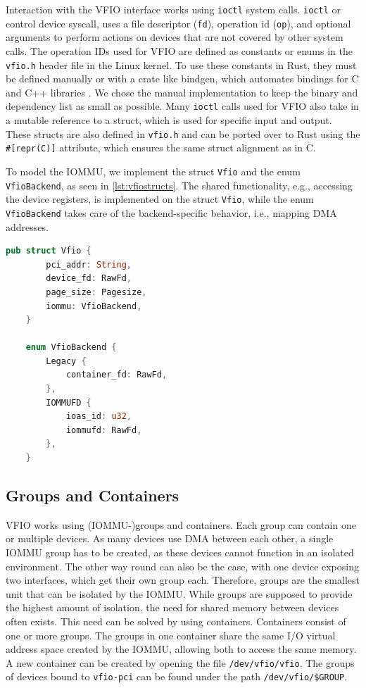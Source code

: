 Interaction with the VFIO interface works using \texttt{ioctl} system calls.
\texttt{ioctl} or control device syscall, uses a file descriptor (\texttt{fd}), operation id (\texttt{op}), and optional arguments to perform actions on devices that are not covered by other system calls.
The operation IDs used for VFIO are defined as constants or enums in the \texttt{vfio.h} header file in the Linux kernel. To use these constants in Rust, they must be defined manually or with a crate like bindgen, which automates bindings for C and C++ libraries \cite{cratebindgen}. We chose the manual implementation to keep the binary and dependency list as small as possible.
Many \texttt{ioctl} calls used for VFIO also take in a mutable reference to a struct, which is used for specific input and output. These structs are also defined in \texttt{vfio.h} and can be ported over to Rust using the \texttt{\#[repr(C)]} attribute, which ensures the same struct alignment as in C.

To model the IOMMU, we implement the struct \texttt{Vfio} and the enum \texttt{VfioBackend}, as seen in \autoref{lst:vfiostructs}.
The shared functionality, e.g., accessing the device registers, is implemented on the struct \texttt{Vfio}, while the enum \texttt{VfioBackend} takes care of the backend-specific behavior, i.e., mapping DMA addresses.

\begin{minipage}{.95\linewidth}
    \begin{lstlisting}[language=Rust,caption={Structs used to model VFIO}, label=lst:vfiostructs]
    pub struct Vfio {
        pci_addr: String,
        device_fd: RawFd,
        page_size: Pagesize,
        iommu: VfioBackend,
    } 

    enum VfioBackend {
        Legacy {
            container_fd: RawFd,
        },
        IOMMUFD {
            ioas_id: u32,
            iommufd: RawFd,
        },
    }
\end{lstlisting}
\end{minipage}

\subsection{Groups and Containers}
VFIO works using (IOMMU-)groups and containers. Each group can contain one or multiple devices. As many devices use DMA between each other, a single IOMMU group has to be created, as these devices cannot function in an isolated environment. The other way round can also be the case, with one device exposing two interfaces, which get their own group each. Therefore, groups are the smallest unit that can be isolated by the IOMMU. While groups are supposed to provide the highest amount of isolation, the need for shared memory between devices often exists. This need can be solved by using containers. Containers consist of one or more groups. The groups in one container share the same I/O virtual address space created by the IOMMU, allowing both to access the same memory.
A new container can be created by opening the file \texttt{/dev/vfio/vfio}. The groups of devices bound to \texttt{vfio-pci} can be found under the path \texttt{/dev/vfio/\$GROUP}.

